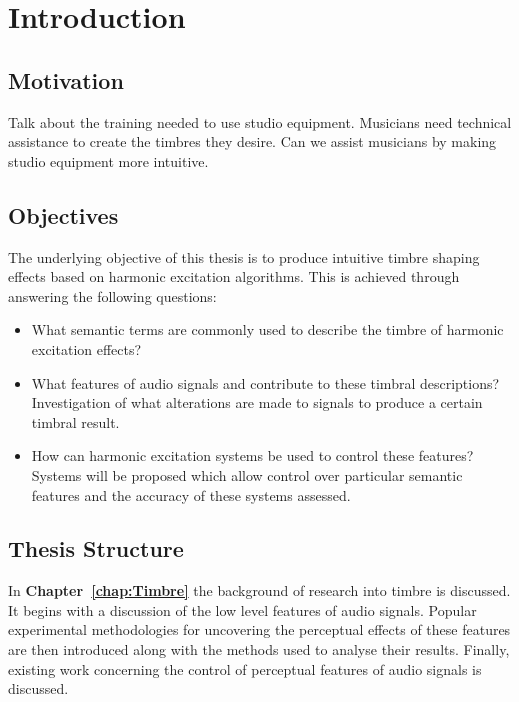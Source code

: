 \chapter{Introduction}
\label{chap:Introduction}

\section{Motivation}
\label{sec:Introduction-Motivation}
	\note
	{
		Talk about the training needed to use studio equipment. Musicians need technical assistance to create the
		timbres they desire. Can we assist musicians by making studio equipment more intuitive.
	}

\section{Objectives}
\label{sec:Introduction-Objectives}
	The underlying objective of this thesis is to produce intuitive timbre shaping effects based on harmonic excitation
	algorithms. This is achieved through answering the following questions:

	\begin{itemize}
		\item What semantic terms are commonly used to describe the timbre of harmonic excitation effects? 
		\item What features of audio signals and contribute to these timbral descriptions? Investigation of what
		      alterations are made to signals to produce a certain timbral result.
		\item How can harmonic excitation systems be used to control these features? Systems will be proposed which
		      allow control over particular semantic features and the accuracy of these systems assessed.
	\end{itemize}

\section{Thesis Structure}
\label{sec:Introduction-ThesisStructure}
	In {\bf{Chapter~\ref{chap:Timbre}}} the background of research into timbre is discussed. It begins with a discussion
	of the low level features of audio signals. Popular experimental methodologies for uncovering the perceptual effects
	of these features are then introduced along with the methods used to analyse their results. Finally, existing work
	concerning the control of perceptual features of audio signals is discussed.

